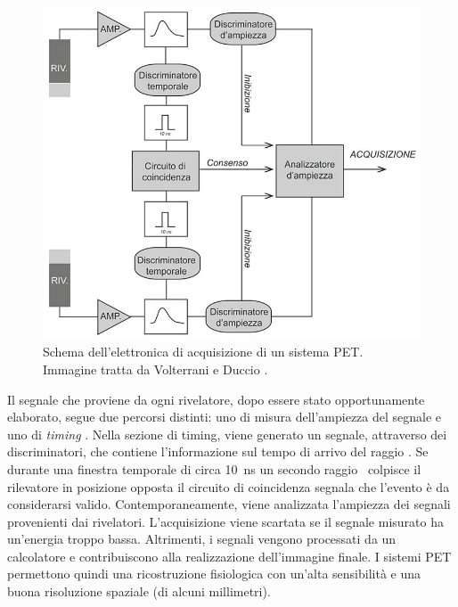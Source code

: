 \begin{figure}[tbh]
	\centering
	\includegraphics[width=0.6\linewidth]{./ImageFiles/circuito pet.jpg}
	\caption{Schema dell'elettronica di acquisizione di un sistema PET. Immagine tratta da Volterrani e Duccio \cite{Volterrani2010}.}
	\label{fig:pet_circuit}
\end{figure} 
Il segnale che proviene da ogni rivelatore, dopo essere stato opportunamente elaborato, segue due percorsi distinti: uno di misura dell'ampiezza del segnale e uno di \textit{timing} \cite{Volterrani2010}. Nella sezione di timing, viene generato un segnale, attraverso dei discriminatori, che contiene l'informazione sul tempo di arrivo del raggio \textgamma. Se durante una finestra temporale di circa \SI{10}{\nano\second} un secondo raggio \textgamma\ colpisce il rilevatore in posizione opposta il circuito di coincidenza segnala che l'evento è da considerarsi valido. Contemporaneamente, viene analizzata l'ampiezza dei segnali provenienti dai rivelatori. L'acquisizione viene scartata se il segnale misurato ha un'energia troppo bassa. Altrimenti, i segnali vengono processati da un calcolatore e contribuiscono alla realizzazione dell'immagine finale. I sistemi PET permettono quindi una ricostruzione fisiologica con un'alta sensibilità e una buona risoluzione spaziale (di alcuni millimetri).

